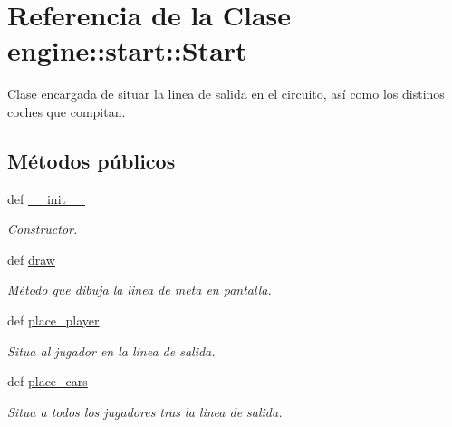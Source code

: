 \hypertarget{classengine_1_1start_1_1Start}{
\section{\-Referencia de la \-Clase engine\-:\-:start\-:\-:\-Start}
\label{classengine_1_1start_1_1Start}
}


\-Clase encargada de situar la linea de salida en el circuito, así como los distinos coches que compitan.  


\subsection*{\-Métodos públicos}
\begin{DoxyCompactItemize}
\item 
def \hyperlink{classengine_1_1start_1_1Start_af84472cf4fae2db3c33f1d29fa0cbea5}{\-\_\-\-\_\-init\-\_\-\-\_\-}
\begin{DoxyCompactList}\small\item\em \-Constructor. \end{DoxyCompactList}\item 
def \hyperlink{classengine_1_1start_1_1Start_a6c66f08167ff9d7d8dcd5f3c76e0ca89}{draw}
\begin{DoxyCompactList}\small\item\em \-Método que dibuja la linea de meta en pantalla. \end{DoxyCompactList}\item 
\hypertarget{classengine_1_1start_1_1Start_af487049f89a77c44aca4fb1d7a6713a6}{
def \hyperlink{classengine_1_1start_1_1Start_af487049f89a77c44aca4fb1d7a6713a6}{place\-\_\-player}}
\label{classengine_1_1start_1_1Start_af487049f89a77c44aca4fb1d7a6713a6}

\begin{DoxyCompactList}\small\item\em \-Situa al jugador en la linea de salida. \end{DoxyCompactList}\item 
\hypertarget{classengine_1_1start_1_1Start_af2e77b627e9baf87aecaeae0ec926fe3}{
def \hyperlink{classengine_1_1start_1_1Start_af2e77b627e9baf87aecaeae0ec926fe3}{place\-\_\-cars}}
\label{classengine_1_1start_1_1Start_af2e77b627e9baf87aecaeae0ec926fe3}

\begin{DoxyCompactList}\small\item\em \-Situa a todos los jugadores tras la linea de salida. \end{DoxyCompactList}\end{DoxyCompactItemize}
